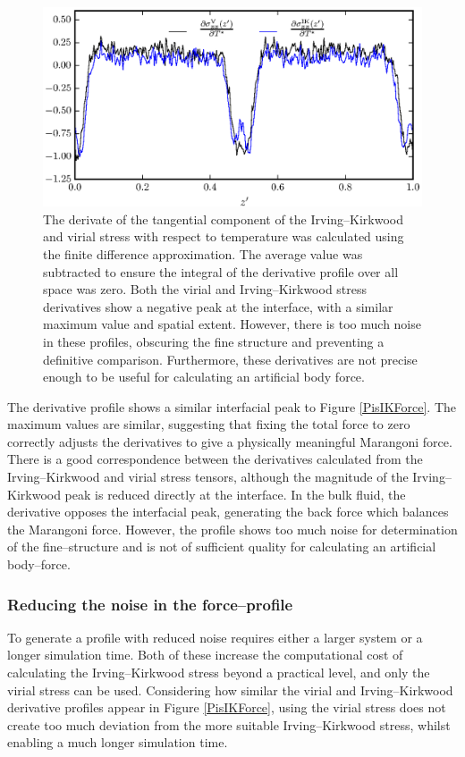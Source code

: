 \begin{figure}[h!]
\centering
\includegraphics[scale=1.0]{Period10Force}
\caption{The derivate of the tangential component of the Irving--Kirkwood and virial stress with respect to temperature was calculated using the finite difference approximation.
The average value was subtracted to ensure the integral of the derivative profile over all space was zero.
Both the virial and Irving--Kirkwood stress derivatives show a negative peak at the interface, with a similar maximum value and spatial extent.
However, there is too much noise in these profiles, obscuring the fine structure and preventing a definitive comparison.
Furthermore, these derivatives are not precise enough to be useful for calculating an artificial body force.
}
\label{Period10Force}
\end{figure}
The derivative profile shows a similar interfacial peak to Figure \ref{PisIKForce}. 
The maximum values are similar, suggesting that fixing the total force to zero correctly adjusts the derivatives to give a physically meaningful Marangoni force.
There is a good correspondence between the derivatives calculated from the Irving--Kirkwood and virial stress tensors, although the magnitude of the Irving--Kirkwood peak is reduced directly at the interface.
In the bulk fluid, the derivative opposes the interfacial peak, generating the back force which balances the Marangoni force.
However, the profile shows too much noise for determination of the fine--structure and is not of sufficient quality for calculating an artificial body--force.

\subsubsection{Reducing the noise in the force--profile}
To generate a profile with reduced noise requires either a larger system or a longer simulation time.
Both of these increase the computational cost of calculating the Irving--Kirkwood stress beyond a practical level, and only the virial stress can be used.
Considering how similar the virial and Irving--Kirkwood derivative profiles appear in Figure \ref{PisIKForce}, using the virial stress does not create too much deviation from the more suitable Irving--Kirkwood stress, whilst enabling a much longer simulation time.
\FloatBarrier


